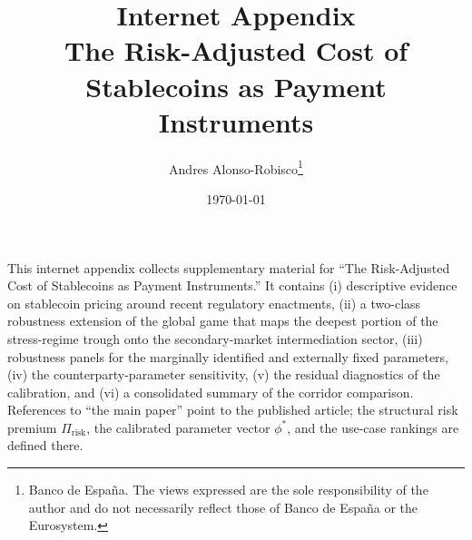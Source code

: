 \documentclass[12pt]{article}
\title{Internet Appendix\\
The Risk-Adjusted Cost of Stablecoins as Payment Instruments}
\author{Andres Alonso-Robisco\thanks{Banco de Espa\~na. The views expressed are
the sole responsibility of the author and do not necessarily reflect those of
Banco de Espa\~na or the Eurosystem.}}
\date{\today}
\begin{document}
\maketitle
\onehalfspacing

\noindent This internet appendix collects supplementary material for ``The Risk-Adjusted Cost of Stablecoins as Payment Instruments.'' It contains (i) descriptive evidence on stablecoin pricing around recent regulatory enactments, (ii) a two-class robustness extension of the global game that maps the deepest portion of the stress-regime trough onto the secondary-market intermediation sector, (iii) robustness panels for the marginally identified and externally fixed parameters, (iv) the counterparty-parameter sensitivity, (v) the residual diagnostics of the calibration, and (vi) a consolidated summary of the corridor comparison. References to ``the main paper'' point to the published article; the structural risk premium $\Pi_{\text{risk}}$, the calibrated parameter vector $\phi^*$, and the use-case rankings are defined there.



\clearpage


\end{document}
